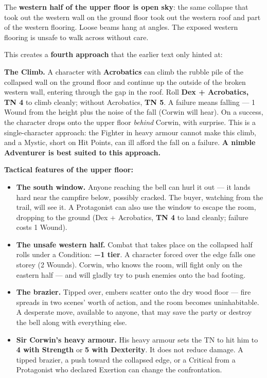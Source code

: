 \documentclass[10pt,a4paper]{article}
\newcommand{\tightlist}{\setlength{\itemsep}{0pt}\setlength{\parskip}{0pt}}
\begin{document}
The \textbf{western half of the upper floor is open sky}: the same collapse that took out the western wall on the ground floor took out the western roof and part of the western flooring. Loose beams hang at angles. The exposed western flooring is unsafe to walk across without care.

This creates a \textbf{fourth approach} that the earlier text only hinted at:

\textbf{The Climb.} A character with \textbf{Acrobatics} can climb the rubble pile of the collapsed wall on the ground floor and continue up the outside of the broken western wall, entering through the gap in the roof. Roll \textbf{Dex + Acrobatics, TN 4} to climb cleanly; without Acrobatics, \textbf{TN 5}. A failure means falling --- 1 Wound from the height plus the noise of the fall (Corwin will hear). On a success, the character drops onto the upper floor \emph{behind} Corwin, with surprise. This is a single-character approach: the Fighter in heavy armour cannot make this climb, and a Mystic, short on Hit Points, can ill afford the fall on a failure. \textbf{A nimble Adventurer is best suited to this approach.}

\par{}\noindent\textbf{Tactical features of the upper floor:}

\begin{itemize}
\tightlist
\item
  \textbf{The south window.} Anyone reaching the bell can hurl it out --- it lands hard near the campfire below, possibly cracked. The buyer, watching from the trail, will see it. A Protagonist can also use the window to escape the room, dropping to the ground (Dex + Acrobatics, \textbf{TN 4} to land cleanly; failure costs 1 Wound).
\item
  \textbf{The unsafe western half.} Combat that takes place on the collapsed half rolls under a Condition: \textbf{−1 tier}. A character forced over the edge falls one storey (2 Wounds). Corwin, who knows the room, will fight only on the eastern half --- and will gladly try to push enemies onto the bad footing.
\item
  \textbf{The brazier.} Tipped over, embers scatter onto the dry wood floor --- fire spreads in two scenes’ worth of action, and the room becomes uninhabitable. A desperate move, available to anyone, that may save the party or destroy the bell along with everything else.
\item
  \textbf{Sir Corwin’s heavy armour.} His heavy armour sets the TN to hit him to \textbf{4 with Strength} or \textbf{5 with Dexterity}. It does not reduce damage. A tipped brazier, a push toward the collapsed edge, or a Critical from a Protagonist who declared Exertion can change the confrontation.
\end{itemize}
\end{document}
